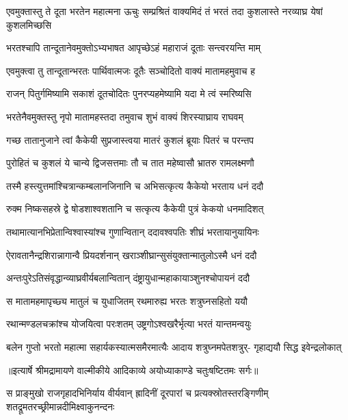 \threelineshloka
{एवमुक्तास्तु ते दूता भरतेन महात्मना}
{ऊचुः सम्प्रश्रितं वाक्यमिदं तं भरतं तदा}
{कुशलास्ते नरव्याघ्र येषां कुशलमिच्छसि} %

\twolineshloka
{भरतश्चापि तान्दूतानेवमुक्तोऽभ्यभाषत}
{आपृच्छेऽहं महाराजं दूताः सन्त्वरयन्ति माम्} %

\twolineshloka
{एवमुक्त्वा तु तान्दूतान्भरतः पार्थिवात्मजः}
{दूतैः सञ्चोदितो वाक्यं मातामहमुवाच ह} %

\twolineshloka
{राजन् पितुर्गमिष्यामि सकाशं दूतचोदितः}
{पुनरप्यहमेष्यामि यदा मे त्वं स्मरिष्यसि} %

\twolineshloka
{भरतेनैवमुक्तस्तु नृपो मातामहस्तदा}
{तमुवाच शुभं वाक्यं शिरस्याघ्राय राघवम्} %

\twolineshloka
{गच्छ तातानुजाने त्वां कैकेयी सुप्रजास्त्वया}
{मातरं कुशलं ब्रूयाः पितरं च परन्तप} %

\twolineshloka
{पुरोहितं च कुशलं ये चान्ये द्विजसत्तमाः}
{तौ च तात महेष्वासौ भ्रातरु रामलक्ष्मणौ} %

\twolineshloka
{तस्मै हस्त्युत्तमांश्चित्रान्कम्बलानजिनानि च}
{अभिसत्कृत्य कैकेयो भरताय धनं ददौ} %

\twolineshloka
{रुक्म निष्कसहस्रे द्वे षोडशाश्वशतानि च}
{सत्कृत्य कैकेयी पुत्रं केकयो धनमादिशत्} %

\twolineshloka
{तथामात्यानभिप्रेतान्विश्वास्यांश्च गुणान्वितान्}
{ददावश्वपतिः शीघ्रं भरतायानुयायिनः} %

\twolineshloka
{ऐरावतानैन्द्रशिरान्नागान्वै प्रियदर्शनान्}
{खराञ्शीघ्रान्सुसंयुक्तान्मातुलोऽस्मै धनं ददौ} %

\twolineshloka
{अन्तःपुरेऽतिसंवृद्धान्व्याघ्रवीर्यबलान्वितान्}
{दंष्ट्रायुधान्महाकायाञ्शुनश्चोपायनं ददौ} %

\twolineshloka
{स मातामहमापृच्छ्य मातुलं च युधाजितम्}
{रथमारुह्य भरतः शत्रुघ्नसहितो ययौ} %

\twolineshloka
{रथान्मण्डलचक्रांश्च योजयित्वा परःशतम्}
{उष्ट्रगोऽश्वखरैर्भृत्या भरतं यान्तमन्वयुः} %

\fourlineindentedshloka
{बलेन गुप्तो भरतो महात्मा}
{सहार्यकस्यात्मसमैरमात्यैः}
{आदाय शत्रुघ्नमपेतशत्रुर्-}
{गृहाद्ययौ सिद्ध इवेन्द्रलोकात्} %


{॥इत्यार्षे श्रीमद्रामायणे वाल्मीकीये आदिकाव्ये अयोध्याकाण्डे चतुःषष्टितमः सर्गः॥}


\threelineshloka
{स प्राङ्मुखो राजगृहादभिनिर्याय वीर्यवान्}
{ह्रादिनीं दूरपारां च प्रत्यक्स्रोतस्तरङ्गिणीम्}
{शतद्रूमतरच्छ्रीमान्नदीमिक्ष्वाकुनन्दनः} %

